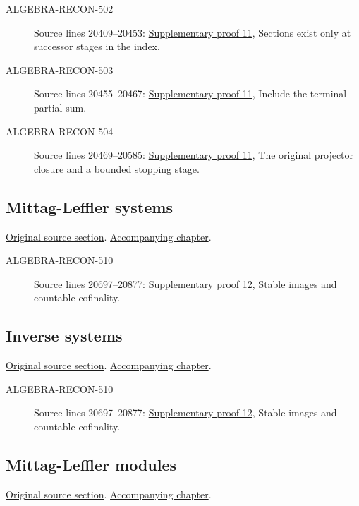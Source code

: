 \begin{description}
\item[ALGEBRA-RECON-502] Source lines 20409--20453: \hyperlink{algebra_transfinite_devissage_notes_20260927}{Supplementary proof 11}, Sections exist only at successor stages in the index.
\item[ALGEBRA-RECON-503] Source lines 20455--20467: \hyperlink{algebra_transfinite_devissage_notes_20260927}{Supplementary proof 11}, Include the terminal partial sum.
\item[ALGEBRA-RECON-504] Source lines 20469--20585: \hyperlink{algebra_transfinite_devissage_notes_20260927}{Supplementary proof 11}, The original projector closure and a bounded stopping stage.
\end{description}

\subsection{Mittag-Leffler systems}
\hypertarget{algebra-source-section-mittag-leffler}{}
\noindent\href{https://github.com/stacks/stacks-project/blob/a04446e57ec1fbc252a871afcec7752fb2807b14/algebra.tex\#L20697}{Original source section}. \href{algebra.pdf\#nameddest=section-mittag-leffler}{Accompanying chapter}.

\begin{description}
\item[ALGEBRA-RECON-510] Source lines 20697--20877: \hyperlink{algebra_ml_review_notes_20260927}{Supplementary proof 12}, Stable images and countable cofinality.
\end{description}

\subsection{Inverse systems}
\hypertarget{algebra-source-section-inverse-systems}{}
\noindent\href{https://github.com/stacks/stacks-project/blob/a04446e57ec1fbc252a871afcec7752fb2807b14/algebra.tex\#L20816}{Original source section}. \href{algebra.pdf\#nameddest=section-inverse-systems}{Accompanying chapter}.

\begin{description}
\item[ALGEBRA-RECON-510] Source lines 20697--20877: \hyperlink{algebra_ml_review_notes_20260927}{Supplementary proof 12}, Stable images and countable cofinality.
\end{description}

\subsection{Mittag-Leffler modules}
\hypertarget{algebra-source-section-mittag-leffler-modules}{}
\noindent\href{https://github.com/stacks/stacks-project/blob/a04446e57ec1fbc252a871afcec7752fb2807b14/algebra.tex\#L20881}{Original source section}. \href{algebra.pdf\#nameddest=section-mittag-leffler-modules}{Accompanying chapter}.

